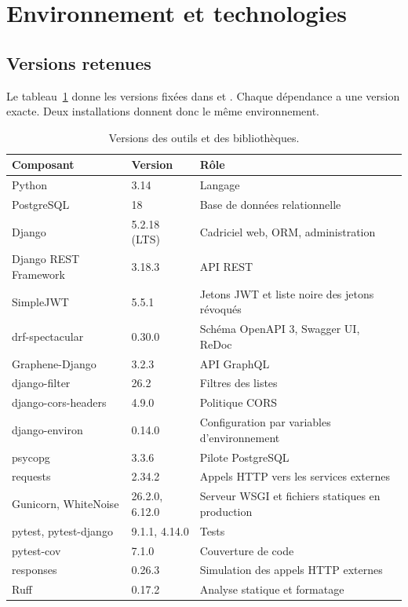 \section{Environnement et technologies}
\label{sec:environnement}

\subsection{Versions retenues}

Le tableau~\ref{tab:versions} donne les versions fixées dans  et . Chaque dépendance a une version exacte. Deux installations donnent donc le même environnement.

\begin{table}[H]
  \centering
  \small
  \caption{Versions des outils et des bibliothèques.}
  \label{tab:versions}
  \begin{tabularx}{\linewidth}{@{}l l X@{}}
    \toprule
    \textbf{Composant} & \textbf{Version} & \textbf{Rôle} \\
    \midrule
    Python & 3.14 & Langage \\
    PostgreSQL & 18 & Base de données relationnelle~\cite{postgresql} \\
    Django & 5.2.18 (LTS) & Cadriciel web, ORM, administration~\cite{django} \\
    Django REST Framework & 3.18.3 & API REST~\cite{drf} \\
    SimpleJWT & 5.5.1 & Jetons JWT et liste noire des jetons révoqués~\cite{simplejwt} \\
    drf-spectacular & 0.30.0 & Schéma OpenAPI 3, Swagger UI, ReDoc~\cite{spectacular} \\
    Graphene-Django & 3.2.3 & API GraphQL~\cite{graphene} \\
    django-filter & 26.2 & Filtres des listes \\
    django-cors-headers & 4.9.0 & Politique CORS \\
    django-environ & 0.14.0 & Configuration par variables d'environnement \\
    psycopg & 3.3.6 & Pilote PostgreSQL \\
    requests & 2.34.2 & Appels HTTP vers les services externes \\
    Gunicorn, WhiteNoise & 26.2.0, 6.12.0 & Serveur WSGI et fichiers statiques en production \\
    \midrule
    pytest, pytest-django & 9.1.1, 4.14.0 & Tests \\
    pytest-cov & 7.1.0 & Couverture de code \\
    responses & 0.26.3 & Simulation des appels HTTP externes \\
    Ruff & 0.17.2 & Analyse statique et formatage \\
    \bottomrule
  \end{tabularx}
\end{table}

